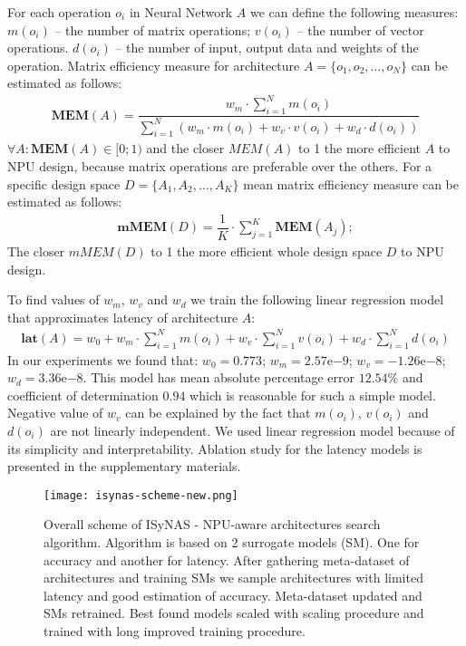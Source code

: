 \documentclass[letterpaper]{article}
\begin{document}
For each operation $o_i$ in Neural Network $A$ we can define the following measures: $m(o_i)$ – the number of matrix operations; $v(o_i)$ – the number of vector operations. $d(o_i)$ – the number of input, output data and weights of the operation.
Matrix efficiency measure for architecture $A=\{o_1,o_2, \dots ,o_N\}$ can be estimated as follows:
\begin{equation}
\begin{aligned}
\boldsymbol{MEM}(A) = \dfrac{ w_m \cdot \sum_{i=1}^N m(o_i)} {\sum_{i=1}^N (w_m \cdot m(o_i) + w_v \cdot v(o_i) + w_d \cdot d(o_i))}
\end{aligned}
\end{equation}
$\forall A: \boldsymbol{MEM}(A) \in [0;1)$ and the closer $MEM(A)$ to 1 the more efficient $A$ to NPU design, because matrix operations are preferable over the others.
For a specific design space $D = \{A_1,A_2, \dots ,A_K \}$ mean matrix efficiency measure can be estimated as follows:
\begin{equation}
\begin{aligned}
\boldsymbol{mMEM}(D) = \dfrac{1}{K} \cdot \sum_{j=1}^K \boldsymbol{MEM}(A_j);
\end{aligned}
\end{equation}
The closer $mMEM(D)$ to 1 the more efficient whole design space $D$ to NPU design.

To find values of $w_m$, $w_v$ and $w_d$ we train the following linear regression model that approximates latency of architecture $A$:
\begin{equation}
\begin{aligned}
\boldsymbol{lat}(A) = w_0 + w_m \cdot \sum_{i=1}^N m(o_i) + w_v \cdot \sum_{i=1}^N v(o_i) + w_d \cdot \sum_{i=1}^N d(o_i)
\end{aligned}
\end{equation}
In our experiments we found that: $w_0 = 0.773$; $w_m = 2.57\mathrm{e}{-9}$; $w_v = -1.26\mathrm{e}{-8}$; $w_d = 3.36\mathrm{e}{-8}$. This model has mean absolute percentage error $12.54\%$ and coefficient of determination $0.94$ which is reasonable for such a simple model. Negative value of $w_v$ can be explained by the fact that $m(o_i)$, $v(o_i)$ and $d(o_i)$ are not linearly independent.
We used linear regression model because of its simplicity and interpretability.
Ablation study for the latency models is presented in the supplementary materials.

\begin{figure}[t]
\begin{center}
\texttt{[image: isynas-scheme-new.png]}
\end{center}
  \caption{Overall scheme of ISyNAS - NPU-aware architectures search algorithm. Algorithm is based on 2 surrogate models (SM). One for accuracy and another for latency. After gathering meta-dataset of architectures and training SMs we sample architectures with limited latency and good estimation of accuracy. Meta-dataset updated and SMs retrained. Best found models scaled with scaling procedure and trained with long improved training procedure.}
\label{fig:isynas_scheme}
\end{figure}
\end{document}
